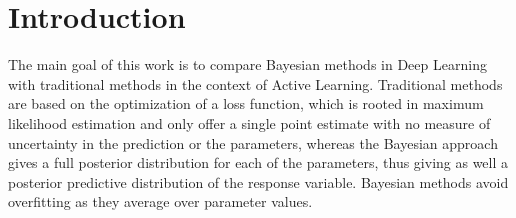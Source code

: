
\chapter{Introduction}
\label{ch:intro}



The main goal of this work is to compare Bayesian methods in Deep Learning with traditional methods in the context of Active Learning. Traditional methods are based on the optimization of a loss function, which is rooted in maximum likelihood estimation and only offer a single point estimate with no measure of uncertainty in the prediction or the parameters, whereas the Bayesian approach gives a full posterior distribution for each of the parameters, thus giving as well a posterior predictive distribution of the response variable. Bayesian methods avoid overfitting as they average over parameter values.


